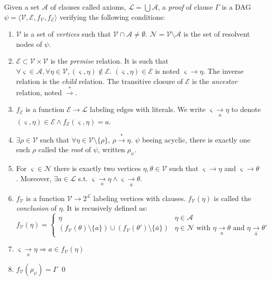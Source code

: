 \documentclass{llncs}
\newcommand{\dual}[1]{\ensuremath{\bar{#1}}}
\begin{document}
\begin{definition}[Proof] \label{def:proof}
Given a set $\mathcal{A}$ of clauses called axioms, $\mathcal{L} = \bigcup{\mathcal{A}}$, a
\emph{proof} of clause $\Gamma$ is a DAG $\psi = \langle \mathcal{V}, \mathcal{E}, f_\mathcal{V},
f_\mathcal{E} \rangle$ verifying the following conditions:
\begin{enumerate}%
  \item $\mathcal{V}$ is a set of \emph{vertices} such that
    $\mathcal{V} \cap \mathcal{A} \neq \emptyset$.
    $\mathcal{N} = \mathcal{V} \setminus \mathcal{A}$ is the set of resolvent nodes of $\psi$.
  \item $\mathcal{E} \subset \mathcal{V} \times \mathcal{V}$ is the \emph{premise} relation.
    It is such that $\forall \varsigma \in \mathcal{A}, \forall \eta \in \mathcal{V}, (\varsigma,
    \eta) \notin \mathcal{E}$. $(\varsigma, \eta) \in \mathcal{E}$ is noted $\varsigma \rightarrow
    \eta$. The inverse relation is the \emph{child} relation. The transitive closure of
    $\mathcal{E}$ is the \emph{ancestor} relation, noted $\xrightarrow{*}$.
  \item $f_\mathcal{E}$ is a function $\mathcal{E} \longrightarrow \mathcal{L}$ labeling edges with
    literals. We write $\varsigma \xrightarrow[a]{} \eta$ to denote
    $(\varsigma, \eta) \in \mathcal{E} \wedge f_\mathcal{E}(\varsigma, \eta) = a$.
  \item $\exists \rho \in \mathcal{V}$ such that $\forall \eta \in \mathcal{V} \setminus \{\rho\}$,
    $\rho \xrightarrow{*} \eta$. $\psi$ beeing acyclic, there is exactly one such $\rho$ called the
    \emph{root} of $\psi$, written $\rho_\psi$.
  \item For $\varsigma \in \mathcal{N}$ there is exactly two vertices $\eta, \theta \in \mathcal{V}$
    such that $\varsigma \rightarrow \eta$ and $\varsigma \rightarrow \theta$. Moreover,
    $\exists a \in \mathcal{L}$ s.t. $\varsigma \xrightarrow[a]{} \eta \wedge \varsigma
    \xrightarrow[\dual{a}]{} \theta$.
  \item $f_\mathcal{V}$ is a function $\mathcal{V} \longrightarrow 2^\mathcal{L}$ labeling vertices
    with clauses. $f_\mathcal{V}(\eta)$ is called the \emph{conclusion} of $\eta$. It is recusively
    defined as:
    \begin{equation*}
      f_\mathcal{V}(\eta) = \begin{cases}
        \eta & \eta \in \mathcal{A} \\
        \left(f_\mathcal{V}(\theta) \setminus \{a\}\right) \cup
        \left(f_\mathcal{V}(\theta') \setminus \{\dual{a}\}\right) &
              \eta \in \mathcal{N} \text{ with } \eta \xrightarrow[a]{} \theta \text{ and }
                                               \eta \xrightarrow[\dual{a}]{} \theta'
      \end{cases}
    \end{equation*}
  \item $\varsigma \xrightarrow[a]{} \eta \Rightarrow a \in f_\mathcal{V}(\eta)$
  \item $f_\mathcal{V}(\rho_\psi) = \Gamma$
  \qed
\end{enumerate}
\end{definition}
\end{document}

